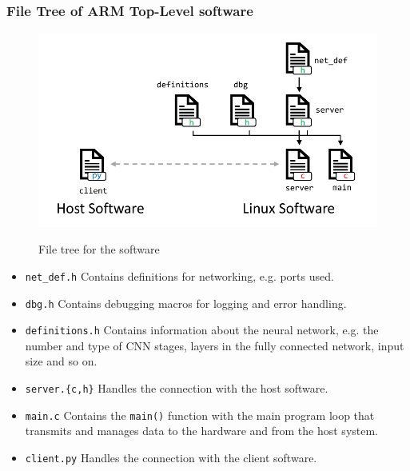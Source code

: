 \subsubsection{File Tree of ARM Top-Level software} \label{SEC:ARM-TOP-SW-FILE-TREE} 
\begin{figure}[h] 
	\centering
	{\includegraphics[scale=0.75]{img/software.pdf}} 
	\caption{File tree for the software}
\end{figure} 
\begin{itemize}
	\item \verb|net_def.h| Contains definitions for networking, e.g. ports used.
	\item \verb|dbg.h| Contains debugging macros for logging and error handling.
	\item \verb|definitions.h| Contains information about the neural network, e.g. the number and type of \ac{CNN} stages, layers in the fully connected network, input size and so on.
	\item \verb|server.{c,h}| Handles the connection with the host software.
	\item \verb|main.c| Contains the \verb|main()| function with the main program loop that transmits and manages data to the hardware and from the host system.
	\item \verb|client.py| Handles the connection with the client software.
\end{itemize}
